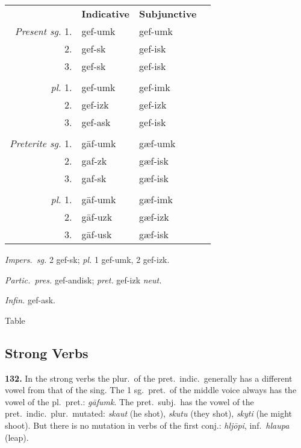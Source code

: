 \documentclass[12pt,letterpaper]{book}
\newcommand\newcaption{\small\refstepcounter{table}%
	\centering Table~\thetable}
\begin{document}
\begin{table}[htbp]
\begin{center}
\begin{tabular}{rlll}
    & \textbf{Indicative} & \textbf{Subjunctive} \\
    \textit{Present sg.} 1. & gef-umk & gef-umk \\
    2. & gef-sk & gef-isk \\
    3. & gef-sk & gef-isk \\
    \\
    \textit{pl.} 1. & gef-umk & gef-imk \\
    2. & gef-izk & gef-izk \\
    3. & gef-ask & gef-isk \\
    \\
    \textit{Preterite sg.} 1. & gāf-umk & gæf-umk \\
    2. & gaf-zk & gæf-isk \\
    3. & gaf-sk & gæf-isk \\
    \\
    \textit{pl.} 1. & gāf-umk & gæf-imk \\
    2. & gāf-uzk & gæf-izk \\
    3. & gāf-usk & gæf-isk \\
\end{tabular}
\end{center}

\begin{center}
\begin{minipage}{3in}
\textit{Impers.\ sg.} 2 gef-sk; \textit{pl.} 1 gef-umk, 2 gef-izk.

\textit{Partic.\ pres.} gef-andisk; \textit{pret.} gef-izk \textit{neut.}

\textit{Infin.} gef-ask.
\end{minipage}
\end{center}
\newcaption
\label{tab:131_2}
\end{table}

\subsection{Strong Verbs}

\textbf{132.} In the strong verbs the plur.\ of the pret.\ indic.\ generally
has a different vowel from that of the sing.  The 1 sg.\ pret.\ of
the middle voice always has the vowel of the pl.\ pret.: \textit{gāfumk}.
The pret.\ subj.\ has the vowel of the pret.\ indic.\ plur.\ mutated:
\textit{skaut} (he shot), \textit{skutu} (they shot), \textit{skyti} (he
might shoot).  But there is no mutation in verbs of the first conj.:
\textit{hljōpi}, inf.\ \textit{hlaupa} (leap).
\end{document}
